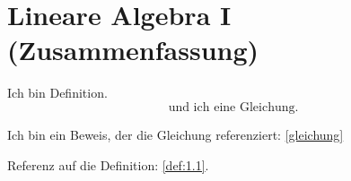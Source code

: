 \chapter{Lineare Algebra I (Zusammenfassung)} %
\label{cha:1}

\begin{definition}
\label{def:1.1}
	Ich bin Definition.
	\begin{equation}
		\text{und ich eine Gleichung.} \label{gleichung}
	\end{equation}
\end{definition}

\begin{beweis}
	Ich bin ein Beweis, der die Gleichung referenziert: \eqref{gleichung}
\end{beweis}

Referenz auf die Definition: \ref{def:1.1}.


\cleardoubleoddemptypage